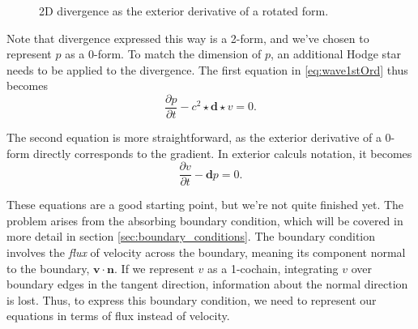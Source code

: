 \documentclass[utf8,english]{gradu3}
\begin{document}
\begin{figure}[h]
  \centering
  \caption{2D divergence as the exterior derivative of a rotated form.}
  \label{fig:2d_divergence}
\end{figure}

Note that divergence expressed this way is a 2-form,
and we've chosen to represent $p$ as a 0-form.
To match the dimension of $p$, an additional Hodge star
needs to be applied to the divergence.
The first equation in \ref{eq:wave1stOrd} thus becomes
\begin{equation}\label{eq:intermediate_eq_1}
  \frac{\partial p}{\partial t} - c^2 \star \mathbf{d} \star v = 0.
\end{equation}

The second equation is more straightforward,
as the exterior derivative of a 0-form directly corresponds to the gradient.
In exterior calculs notation, it becomes
\begin{equation}\label{eq:intermediate_eq_2}
  \frac{\partial v}{\partial t} - \mathbf{d} p = 0.
\end{equation}

These equations are a good starting point, but we're not quite finished yet.
The problem arises from the absorbing boundary condition,
which will be covered in more detail in section \ref{sec:boundary_conditions}.
The boundary condition involves the \textit{flux} of velocity across the boundary,
meaning its component normal to the boundary, $\mathbf{v} \cdot \mathbf{n}$.
If we represent $v$ as a 1-cochain, integrating $v$ over boundary edges
in the tangent direction, information about the normal direction is lost.
Thus, to express this boundary condition,
we need to represent our equations in terms of flux instead of velocity.
\end{document}
